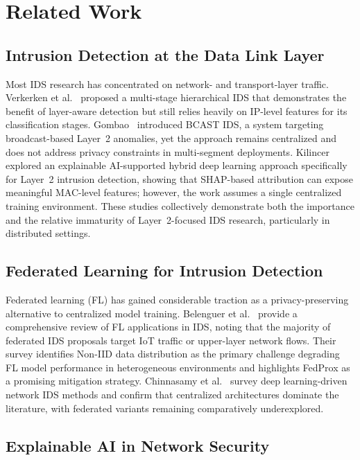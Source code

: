\documentclass[conference]{IEEEtran}
\begin{document}
\section{Related Work}
\label{sec:related}

\subsection{Intrusion Detection at the Data Link Layer}

Most IDS research has concentrated on network- and transport-layer traffic. Verkerken
et al.~\cite{verkerken2023} proposed a multi-stage hierarchical IDS that demonstrates
the benefit of layer-aware detection but still relies heavily on IP-level features for
its classification stages. Gombao~\cite{gombao2025} introduced BCAST IDS, a system
targeting broadcast-based Layer~2 anomalies, yet the approach remains centralized and
does not address privacy constraints in multi-segment deployments. Kilincer~\cite{kilincer2025}
explored an explainable AI-supported hybrid deep learning approach specifically for
Layer~2 intrusion detection, showing that SHAP-based attribution can expose meaningful
MAC-level features; however, the work assumes a single centralized training environment.
These studies collectively demonstrate both the importance and the relative immaturity
of Layer~2-focused IDS research, particularly in distributed settings.

\subsection{Federated Learning for Intrusion Detection}

Federated learning (FL) has gained considerable traction as a privacy-preserving
alternative to centralized model training. Belenguer et al.~\cite{belenguer2025}
provide a comprehensive review of FL applications in IDS, noting that the majority of
federated IDS proposals target IoT traffic or upper-layer network flows. Their survey
identifies Non-IID data distribution as the primary challenge degrading FL model
performance in heterogeneous environments and highlights FedProx as a promising
mitigation strategy. Chinnasamy et al.~\cite{chinnasamy2025} survey deep
learning-driven network IDS methods and confirm that centralized architectures dominate
the literature, with federated variants remaining comparatively underexplored.

\subsection{Explainable AI in Network Security}
\end{document}
